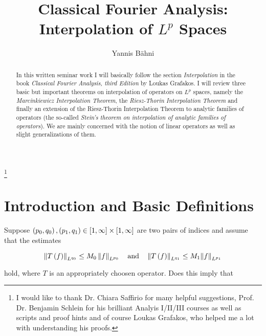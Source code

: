 
\usepackage{commath}



\begin{abstract}
	In this written seminar work I will basically follow the section \emph{Interpolation} in the book \emph{Classical Fourier Analysis, third Edition} by Loukas Grafakos. I will review three basic but important theorems on interpolation of operators on $L^p$ spaces, namely the \emph{Marcinkiewicz Interpolation Theorem}, the \emph{Riesz-Thorin Interpolation Theorem} and finally an extension of the Riesz-Thorin Interpolation Theorem to analytic families of operators (the so-called \emph{Stein's theorem on interpolation of analytic families of operators}). We are mainly concerned with the notion of linear operators as well as slight generalizations of them. 
\end{abstract}

\title{Classical Fourier Analysis: Interpolation of $L^p$ Spaces}
\author{Yannis B\"{a}hni}
\address[Yannis B\"{a}hni]{University of Zurich, R\"{a}mistrasse 71, 8006 Zurich}
\thanks{I would like to thank Dr. Chiara Saffirio for many helpful suggestions, Prof. Dr. Benjamin Schlein for his brilliant Analyis I/II/III courses as well as scripts and proof hints and of course Loukas Grafakos, who helped me a lot with understanding his proofs.}
\maketitle

\tableofcontents
\listoffigures

\mainsectionstyle

\section{Introduction and Basic Definitions}
Suppose $\del{p_0,q_0},\del{ p_1,q_1} \in \intcc{1,\infty} \times \intcc{1,\infty}$ are two pairs of indices and assume that the estimates 

\begin{equation*}
	\norm[0]{T\del{f}}_{L^{q_0}} \leq M_0 \norm[0]{f}_{L^{p_0}} \quad \text{and} \quad \norm[0]{T\del{f}}_{L^{q_1}} \leq M_1\norm{f}_{L^{p_1}}
\end{equation*}

\noindent hold, where $T$ is an appropriately choosen operator. Does this imply that

